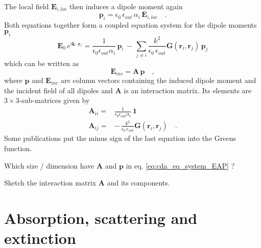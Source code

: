 The local field $\mathbf{E}_{i, loc}$ then induces a dipole moment again 
\begin{equation}
\mathbf{p}_i = \epsilon_0 \, \epsilon_{out} \, \alpha_i \, \mathbf{E}_{i,loc} \quad .
\end{equation}
Both equations together form a coupled equation system for the 
 dipole moments $ \mathbf{p}_i$
\begin{equation}
\mathbf{E}_{0} \, e^{i \mathbf{k} \cdot \mathbf{r}_i} =
\frac{1}{\epsilon_0 \epsilon_{out} \alpha_i} \, \mathbf{p}_i 
 \,  - \, 
 \sum_{j \neq i} \frac{k^2}{\epsilon_0 \, \epsilon_{out}} 
 \mathbf{G}(\mathbf{r}_i, \mathbf{r}_j)  \, \mathbf{p}_j 
\end{equation} 
 which can be written as
 \begin{equation}
 \mathbf{E}_{inc} = \mathbf{A} \, \mathbf{p} \quad , \label{eq:cda_eq_system_EAP}
 \end{equation}
where $\mathbf{p}$ and $ \mathbf{E}_{inc} $ are column vectors containing the induced dipole moment and the incident field of all dipoles and $\mathbf{A} $ is an interaction matrix. Its elements are $3 \times 3$-sub-matrices given by
 \begin{align}
 \mathbf{A}_{ii} = &\frac{1}{\epsilon_0 \epsilon_{out} \alpha_i} \, \mathbf{1} \\
 \mathbf{A}_{ij} = & - \, 
 \frac{k^2}{\epsilon_0 \, \epsilon_{out}} 
 \mathbf{G}(\mathbf{r}_i, \mathbf{r}_j)  \quad .
 \end{align}
Some publications put the minus sign of the last equation into the Greens function. 

\begin{questions} 
\item Which size / dimension have $ \mathbf{A}$ and $\mathbf{p}$ in eq. \ref{eq:cda_eq_system_EAP} ?
\item Sketch the interaction matrix $ \mathbf{A}$ and its components.
\end{questions}

\section{Absorption, scattering and extinction} 
 

